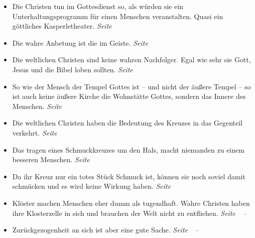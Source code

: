 \begin{itemize}
\begin{itemize}

 \item Die Christen tun im Gottesdienst so, als würden sie ein
Unterhaltungsprogramm
 für einen Menschen veranstalten. Quasi ein göttliches Kasperletheater.
 \dotfill \textit{Seite~\pageref{ref:05_02_kasperletheater}}\\

 \item Die wahre Anbetung ist die im Geiste.
 \dotfill \textit{Seite~\pageref{ref:05_04_wahre_anbetung}}\\

 \item Die weltlichen Christen sind keine wahren Nachfolger. Egal wie sehr sie
Gott, Jesus und die Bibel loben sollten.
 \dotfill \textit{Seite~\pageref{ref:05_05_wahre_nachfolge}}\\

 \item So wie der Mensch der Tempel Gottes ist -- und nicht der äußere Tempel
-- so ist auch keine äußere Kirche die Wohnstätte Gottes, sondern das Innere des
Menschen.
 \dotfill \textit{Seite~\pageref{ref:05_06_tempel}}\\

 \item Die weltlichen Christen haben die Bedeutung des Kreuzes in das Gegenteil
verkehrt.
 \dotfill \textit{Seite~\pageref{ref:05_07_kreuz}}\\

 \item Das tragen eines Schmuckkreuzes um den Hals, macht niemanden zu einem
besseren Menschen.
 \dotfill \textit{Seite~\pageref{ref:05_08_kreuz}}\\

 \item Da ihr Kreuz nur ein totes Stück Schmuck ist, können sie noch soviel
damit schmücken und es wird keine Wirkung haben.
 \dotfill \textit{Seite~\pageref{ref:05_09_kreuz}}\\

 \item Klöster machen Menschen eher dumm als tugendhaft. Wahre Christen haben ihre
Klosterzelle in sich und brauchen der Welt nicht zu entfliehen.
 \dotfill \textit{Seite~\pageref{ref:05_11_kloster}~--~\pageref{ref:05_11_kloster_ende}}\\

 \item Zurückgezogenheit an sich ist aber eine gute Sache.
 \dotfill \textit{Seite~\pageref{ref:05_13_zurueckgezogenheit}~--~\pageref{ref:05_13_zurueckgezogenheit_ende}}\\


\end{itemize}
\end{itemize}
